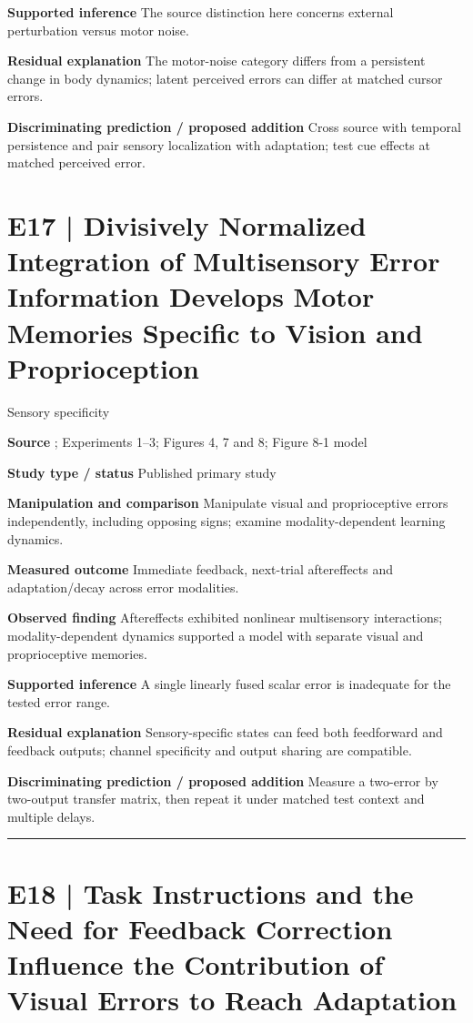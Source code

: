 \documentclass[11pt,a4paper]{article}
\begin{document}
\textbf{Supported inference} The source distinction here concerns external perturbation versus motor noise.\par
\textbf{Residual explanation} The motor-noise category differs from a persistent change in body dynamics; latent perceived errors can differ at matched cursor errors.\par
\textbf{Discriminating prediction / proposed addition} Cross source with temporal persistence and pair sensory localization with adaptation; test cue effects at matched perceived error.\par
\clearpage\section{E17 | Divisively Normalized Integration of Multisensory Error Information Develops Motor Memories Specific to Vision and Proprioception}
{\small\sffamily\color{navy} Sensory specificity}\par
\textbf{Source} \cite{hayashi2020}; Experiments 1--3; Figures 4, 7 and 8; Figure 8-1 model\par
\textbf{Study type / status} Published primary study\par
\textbf{Manipulation and comparison} Manipulate visual and proprioceptive errors independently, including opposing signs; examine modality-dependent learning dynamics.\par
\textbf{Measured outcome} Immediate feedback, next-trial aftereffects and adaptation/decay across error modalities.\par
\textbf{Observed finding} Aftereffects exhibited nonlinear multisensory interactions; modality-dependent dynamics supported a model with separate visual and proprioceptive memories.\par
\textbf{Supported inference} A single linearly fused scalar error is inadequate for the tested error range.\par
\textbf{Residual explanation} Sensory-specific states can feed both feedforward and feedback outputs; channel specificity and output sharing are compatible.\par
\textbf{Discriminating prediction / proposed addition} Measure a two-error by two-output transfer matrix, then repeat it under matched test context and multiple delays.\par
\bigskip\hrule\medskip\section{E18 | Task Instructions and the Need for Feedback Correction Influence the Contribution of Visual Errors to Reach Adaptation}
\end{document}
